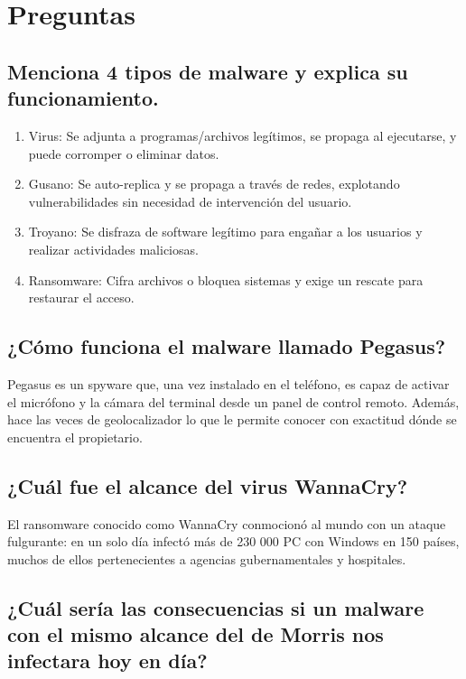 \section{Preguntas}

\subsection{Menciona 4 tipos de malware y explica su funcionamiento.}

\begin{enumerate}
    \item Virus: Se adjunta a programas/archivos legítimos, se propaga al ejecutarse, y puede corromper o eliminar datos.
    \item Gusano: Se auto-replica y se propaga a través de redes, explotando vulnerabilidades sin necesidad de intervención del usuario.
    \item Troyano: Se disfraza de software legítimo para engañar a los usuarios y realizar actividades maliciosas.
    \item Ransomware: Cifra archivos o bloquea sistemas y exige un rescate para restaurar el acceso.
\end{enumerate}

\subsection{¿Cómo funciona el malware llamado Pegasus?}

Pegasus es un spyware que, una vez instalado en el teléfono, es capaz de activar el micrófono y la cámara del terminal desde un panel de control remoto. Además, hace las veces de geolocalizador lo que le permite conocer con exactitud dónde se encuentra el propietario. 

\subsection{¿Cuál fue el alcance del virus WannaCry?}

El ransomware conocido como WannaCry conmocionó al mundo con un ataque fulgurante: en un solo día infectó más de 230 000 PC con Windows en 150 países, muchos de ellos pertenecientes a agencias gubernamentales y hospitales.

\subsection{¿Cuál sería las consecuencias si un malware con el mismo alcance del de Morris nos infectara hoy en día?}

